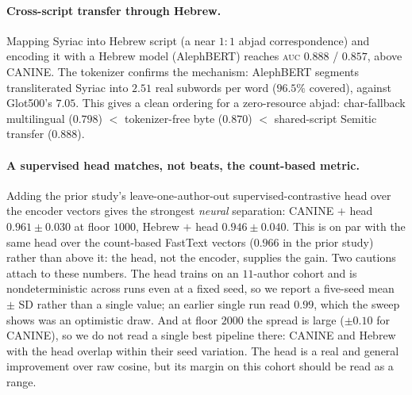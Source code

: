 \documentclass[11pt]{article}
\newcommand{\auc}{\textsc{auc}}
\begin{document}
\paragraph{Cross-script transfer through Hebrew.}
Mapping Syriac into Hebrew script (a near $1{:}1$ abjad correspondence) and
encoding it with a Hebrew model (AlephBERT) reaches \auc{} $0.888$ / $0.857$, above
CANINE. The tokenizer confirms the mechanism: AlephBERT segments transliterated
Syriac into $2.51$ real subwords per word ($96.5\%$ covered), against Glot500's
$7.05$. This gives a clean ordering for a zero-resource abjad: char-fallback
multilingual ($0.798$) $<$ tokenizer-free byte ($0.870$) $<$ shared-script Semitic
transfer ($0.888$).

\paragraph{A supervised head matches, not beats, the count-based metric.}
Adding the prior study's leave-one-author-out supervised-contrastive head over the
encoder vectors gives the strongest \emph{neural} separation: CANINE $+$ head
$0.961\pm0.030$ at floor $1000$, Hebrew $+$ head $0.946\pm0.040$. This is on par
with the same head over the count-based FastText vectors ($0.966$ in the prior
study) rather than above it: the head, not the encoder, supplies the gain. Two
cautions attach to these numbers. The head trains on an $11$-author cohort and is nondeterministic across
runs even at a fixed seed, so we report a five-seed mean $\pm$ SD rather than a
single value; an earlier single run read $0.99$, which the sweep shows was an
optimistic draw. And at floor $2000$ the spread is large ($\pm0.10$ for CANINE), so
we do not read a single best pipeline there: CANINE and Hebrew with the head
overlap within their seed variation. The head is a real and general improvement
over raw cosine, but its margin on this cohort should be read as a range.

\begin{table}[t]
  \centering
  
  \caption{Authorship separation \auc{} at token floors $1000$ / $2000$, same
  cohort and metric as the prior count-based study (its FastText, word2vec, and
  Delta numbers shown for reference). AV-head rows are five-seed mean $\pm$ SD; all
  other neural rows are deterministic given the encoder.}
  \label{tab:bakeoff}
\end{table}

\begin{table}[t]
  \centering
  
  \caption{Intrinsic language-model effect of LoRA continued pretraining against a
  frozen linear probe, isolated with an identical masked pseudo-bits-per-byte
  scorer (bidirectional, so comparable only among CANINE variants).}
  \label{tab:intrinsic}
\end{table}
\end{document}
